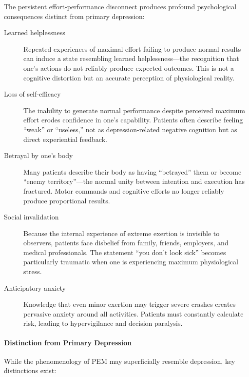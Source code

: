 The persistent effort-performance disconnect produces profound psychological consequences distinct from primary depression:

\begin{description}
    \item[Learned helplessness] Repeated experiences of maximal effort failing to produce normal results can induce a state resembling learned helplessness---the recognition that one's actions do not reliably produce expected outcomes. This is not a cognitive distortion but an accurate perception of physiological reality.

    \item[Loss of self-efficacy] The inability to generate normal performance despite perceived maximum effort erodes confidence in one's capability. Patients often describe feeling ``weak'' or ``useless,'' not as depression-related negative cognition but as direct experiential feedback.

    \item[Betrayal by one's body] Many patients describe their body as having ``betrayed'' them or become ``enemy territory''---the normal unity between intention and execution has fractured. Motor commands and cognitive efforts no longer reliably produce proportional results.

    \item[Social invalidation] Because the internal experience of extreme exertion is invisible to observers, patients face disbelief from family, friends, employers, and medical professionals. The statement ``you don't look sick'' becomes particularly traumatic when one is experiencing maximum physiological stress.

    \item[Anticipatory anxiety] Knowledge that even minor exertion may trigger severe crashes creates pervasive anxiety around all activities. Patients must constantly calculate risk, leading to hypervigilance and decision paralysis.
\end{description}

\paragraph{Distinction from Primary Depression}

While the phenomenology of PEM may superficially resemble depression, key distinctions exist:

